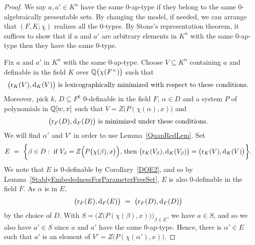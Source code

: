\begin{proof}
We say $a, a' \in K^n$ have the same 0-ap-type if they belong to the same $0$-algebraically presentable sets. 
By changing the model, if needed, we can arrange that $ (F, K; \chi) $ realizes all the $0$-types. 
By Stone's representation theorem, it suffices to show that if $ a$ and $ a' $ are arbitrary elements in $  K^n $ with the same $0$-ap-type then they have the same $0$-type. 

\noindent
Fix $a$ and $a'$ in $K^n$ with the same  $0$-ap-type. 
Choose $V \subseteq K^n$ containing $a$ and definable in the field $K$ over $ \mathbb{Q}\big( \chi(F^\times)\big) $  such that $$\big(\mathrm{r}_K(V), \mathrm{d}_K(V)\big) \text{ is lexicographically minimized with respect to these conditions}. $$ 
Moreover, pick $k$, $D \subseteq F^k$ $0$-definable in the field $F$, $\alpha \in D$ and a system $P$ of polynomials in $\mathbb{Q}[w,x]$ such that $V = Z\big( P( \chi( \alpha), x)\big)$ and $$\big(\mathrm{r}_F(D), \mathrm{d}_F(D) \big) \text{ is minimized under these conditions}.$$
We will find $\alpha'$ and $ V'$ in order to use Lemma~\ref{QuanRedLem}. 
Set $$E\  =\ \bigg\{ \beta \in D : \text{ if } V_\beta = Z\Big( P\big( \chi( \beta), x\big)\Big) \text{, then } \big(\mathrm{r}_K(V_\beta), \mathrm{d}_K(V_\beta)\big)=\big(\mathrm{r}_K(V), \mathrm{d}_K(V)\big)\bigg\} .$$ 
We note that $E $ is $0$-definable by Corollary~\ref{DOE2}, and so by Lemma~\ref{StablyEmbedednessForParameterFreeSet}, $ E$ is also $0$-definable in the field $F$. 
As $\alpha$ is in $E$, 
$$ \big(\mr_F(E), \md_F(E) \big) \ = \ \big(\mr_F(D), \md_F(D) \big) $$ by the choice of $D$. 
With $S = \big( Z\big(P(\chi(\beta),x)\big)\big)_{\beta \in E}$, we have $a\in S$, and so we also have $a' \in S$ since $a$ and $ a'$ have the same 0-ap-type. Hence, there is $\alpha'\in E$ such that $a'$ is an element of $V' = Z\big(P(\chi(\alpha'),x)\big)$.


\end{proof}
